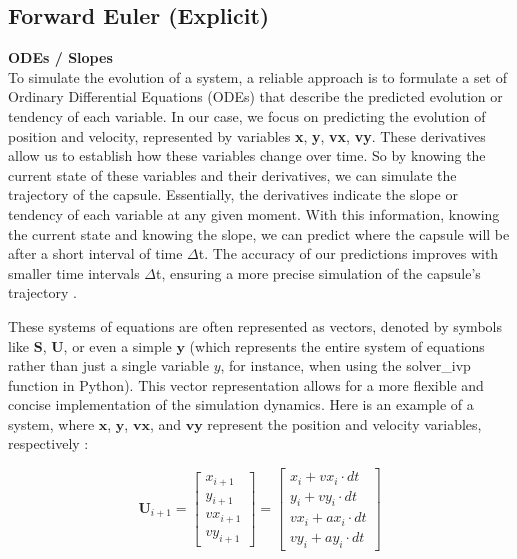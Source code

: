 \documentclass[runningheads]{llncs}
\begin{document}
\subsection{Forward Euler (Explicit)}

\textbf{ODEs / Slopes\\}
To simulate the evolution of a system, a reliable approach is to formulate a set of Ordinary Differential Equations (ODEs) that describe the predicted evolution or tendency of each variable. In our case, we focus on predicting the evolution of position and velocity, represented by variables \textbf{x}, \textbf{y}, \textbf{vx}, \textbf{vy}. These derivatives allow us to establish how these variables change over time. So by knowing the current state of these variables and their derivatives, we can simulate the trajectory of the capsule. Essentially, the derivatives indicate the slope or tendency of each variable at any given moment. With this information, knowing the current state and knowing the slope, we can predict where the capsule will be after a short interval of time \(\Delta\)t. The accuracy of our predictions improves with smaller time intervals \(\Delta\)t, ensuring a more precise simulation of the capsule's trajectory \cite{github_metaphysics}.

These systems of equations are often represented as vectors, denoted by symbols like \( \mathbf{S} \), \( \mathbf{U} \), or even a simple \( \mathbf{y} \) (which represents the entire system of equations rather than just a single variable \( y \), for instance, when using the solver\_ivp function in Python). This vector representation allows for a more flexible and concise implementation of the simulation dynamics. Here is an example of a system, where \( \mathbf{x} \), \( \mathbf{y} \), \( \mathbf{vx} \), and \( \mathbf{vy} \) represent the position and velocity variables, respectively \cite{github_channel}:

\begin{equation}
\mathbf{U}_{i+1} = \begin{bmatrix}
x_{i+1} \\
y_{i+1} \\
vx_{i+1} \\
vy_{i+1}
\end{bmatrix} =
\begin{bmatrix}
x_i + vx_i \cdot dt \\
y_i + vy_i \cdot dt \\
vx_i + ax_i \cdot dt \\
vy_i + ay_i \cdot dt
\end{bmatrix}
\end{equation}
\end{document}
